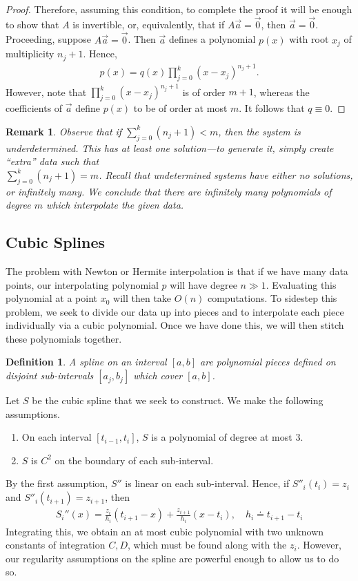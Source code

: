 \documentclass[12pt,reqno]{amsart}
\numberwithin{equation}{section}  %
\newtheorem*{definition}{Definition}
\newtheorem*{remark}{Remark}
\begin{document}
\begin{proof}
Therefore, assuming this condition, to complete
the proof it will be enough to show that $A$ is invertible, or, equivalently,
that if $A \vec{a}=\vec{0}$, then $\vec{a} = \vec{0}$. Proceeding, suppose
$A \vec{a}=\vec{0}$. Then $\vec{a}$ defines a polynomial $p(x)$ with root $x_j$ of
multiplicity $n_j +1$. Hence,
\begin{equation*}
\begin{split}
p(x) = q(x) \prod_{j=0}^{k}(x-x_{j})^{n_{j}+1}.
\end{split}
\end{equation*}
However, note that $\prod_{j=0}^{k}(x-x_{j})^{n_{j}+1}$ is of order $m+1$,
whereas the coefficients of $\vec{a}$ define $p(x)$ to be of order at most $m$.
It follows that $q \equiv 0$. 
\end{proof}
\begin{remark}
Observe that if $\sum_{j=0}^{k}(n_j + 1) < m$, then the system is underdetermined.
This has at least one solution---to generate it, simply create
``extra'' data such that \\ $\sum_{j=0}^k (n_j + 1) = m$. Recall that
undetermined systems have either no solutions, or infinitely many. 
We conclude that there are infinitely many polynomials of degree $m$ which
interpolate the given data.
\end{remark}
\subsection{Cubic Splines}
The problem with Newton or Hermite interpolation is that if we have
many data points, our interpolating polynomial $p$ will have degree $n \gg 1$.
Evaluating this polynomial at a point $x_0$ will then take $O(n)$ computations.
To sidestep this problem, we seek to divide our data up into pieces
and to interpolate each piece individually via a cubic polynomial.
Once we have done this, we will then stitch these polynomials together.
\begin{definition}
A \emph{spline} on an interval $[a,b]$ are polynomial pieces defined on 
disjoint sub-intervals $[a_j,b_j]$ which cover $[a,b]$. 
\end{definition}
Let $S$ be the cubic spline that we seek to construct. We make
the following assumptions.
\begin{enumerate}
\item On each interval $[t_{i-1}, t_i]$, $S$ is a polynomial of degree
at most $3$.
\item $S$ is $C^2$ on the boundary of each sub-interval.
\end{enumerate}
By the first assumption, $S''$ is linear on each sub-interval.
Hence, if $S''_i(t_i) = z_i$ and $S''_{i}(t_{i+1}) = z_{i+1}$,
then
\begin{align*}
S_{i}''(x) = \frac{z_i}{h_i}(t_{i+1} - x) + \frac{z_{i+1}}{h_i}(x- t_i),
\quad h_i \doteq
t_{i+1}- t_i	
\end{align*}
Integrating this, we obtain an at most cubic polynomial with  two unknown
constants of integration $C, D$, which must be found along with the $z_i$.
However, our regularity assumptions on the spline are powerful enough to allow
us to do so.
\end{document}
